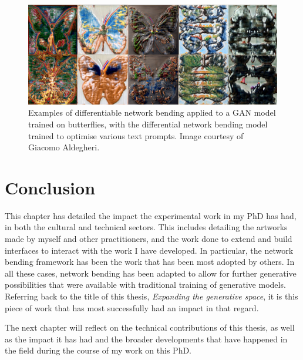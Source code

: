 \begin{figure}[!htb]
    \centering
    \captionsetup{justification=centering}
    \includegraphics[width=1\textwidth]{figures/c7_impact/net-bend-technical/diff-net-bend.png}
    \caption[Differential network bending]{Examples of differentiable network bending \citep{aldegheri2023hacking} applied to a GAN model trained on butterflies, with the differential network bending model trained to optimise various text prompts. Image courtesy of Giacomo Aldegheri.}
    \label{fig:c7:differential-net-bend}
\end{figure}


\section{Conclusion}

This chapter has detailed the impact the experimental work in my PhD has had, in both the cultural and technical sectors. 
This includes detailing the artworks made by myself and other practitioners, and the work done to extend and build interfaces to interact with the work I have developed. 
In particular, the network bending framework has been the work that has been most adopted by others. 
In all these cases, network bending has been adapted to allow for further generative possibilities that were available with traditional training of generative models. 
Referring back to the title of this thesis, \textit{Expanding the generative space}, it is this piece of work that has most successfully had an impact in that regard. 

The next chapter will reflect on the technical contributions of this thesis, as well as the impact it has had and the broader developments that have happened in the field during the course of my work on this PhD.
